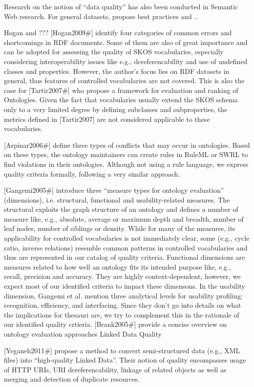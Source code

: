 Research on the notion of “data quality” has also been conducted in Semantic Web research. For general datasets, \cite{Heath2011,Hogan2010} propose best practices and ..   \cite{Tartir2007} 

Hogan and ??? [Hogan2009#] identify four categories of common errors and shortcomings in RDF documents. Some of them are also of great importance and can be adopted for assessing the quality of SKOS vocabularies, especially considering interoperability issues like e.g., dereferencability and use of undefined classes and properties. However, the author’s focus lies on RDF datasets in general, thus features of controlled vocabularies are not covered. This is also the case for [Tartir2007#] who propose a framework for evaluation and ranking of Ontologies. Given the fact that vocabularies usually extend the SKOS schema only to a very limited degree by defining subclasses and subproperties, the metrics defined in [Tartir2007] are not considered applicable to these vocabularies.

[Arpinar2006#] define three types of conflicts that may occur in ontologies. Based on these types, the ontology maintainers can create rules in RuleML or SWRL to find violations in their ontologies. Although not using a rule language, we express quality criteria formally, following a very similar approach.

[Gangemi2005#] introduce three “measure types for ontology evaluation” (dimensions), i.e. structural, functional and usability-related measures. The structural exploits the graph structure of an ontology and defines a number of measure like, e.g., absolute, average or maximum depth and breadth, number of leaf nodes, number of siblings or density. While for many of the measures, its applicability for controlled vocabularies is not immediately clear, some (e.g., cycle ratio, inverse relations) resemble common patterns in controlled vocabularies and thus are represented in our catalog of quality criteria. Functional dimensions are measures related to how well an ontology fits its intended purpose like, e.g., recall, precision and accuracy. They are highly context-dependent, however, we expect most of our identified criteria to impact these dimensons. In the usability dimension, Gangemi et al. mention three analytical levels for usability profiling: recognition, efficiency, and interfacing. Since they don’t go into details on what the implications for thesauri are, we try to complement this in the rationale of our identified quality crtieria. [Brank2005#] provide a concise overview on ontology evaluation approaches
Linked Data Quality

[Yeganeh2011#] propose a method to convert semi-structured data (e.g., XML files) into “high-quality Linked Data”. Their notion of quality encompasses usage of HTTP URIs, URI dereferencability, linkage of related objects as well as merging and detection of duplicate resources.
